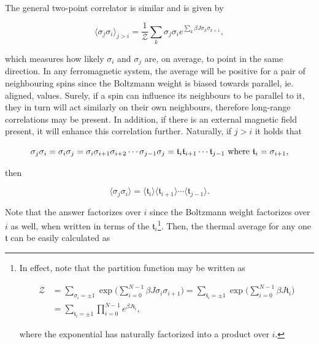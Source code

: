 \documentclass{homework}
\begin{document}
\blanky \\

The general two-point correlator is similar and is given by 

\begin{equation}
    \langle \sigma_j \sigma_i \rangle_{j > i} = \frac{1}{\mathcal{Z}} \sum_{k} \sigma_j \sigma_i e^{\sum_{k} \beta J \sigma_k \sigma_{k+1}},
\end{equation}

which measures how likely $\sigma_i$ and $\sigma_j$ are, on average, to point in the same direction. In any ferromagnetic system, the average will be positive for a pair of neighbouring spins since the Boltzmann weight is biased towards parallel, ie. aligned, values. Surely, if a spin can influence its neighbours to be parallel to it, they in turn will act similarly on their own neighbours, therefore long-range correlations may be present. In addition, if there is an external magnetic field present, it will enhance this correlation further. Naturally, if $j>i$ it holds that 

\begin{equation*}
    \sigma_j \sigma_i = \sigma_i \sigma_j = \sigma_i \sigma_{i+1} \sigma_{i+2} \cdots \sigma_{j-1} \sigma_j = \mathfrak{t}_{i}\mathfrak{t}_{i+1}\cdots\mathfrak{t}_{j-1} \textnormal{ where } \mathfrak{t}_i = \sigma_{i+1}, 
\end{equation*}

then 

\begin{equation}
    \langle \sigma_j \sigma_i \rangle = \langle \mathfrak{t}_i \rangle \langle \mathfrak{t}_{i+1} \rangle \cdots \langle \mathfrak{t}_{j-1} \rangle.
\end{equation}

Note that the answer factorizes over $i$ since the Boltzmann weight factorizes over $i$ as well, when written in terms of the $\mathfrak{t}_i$\footnote{In effect, note that the partition function may be written as 

\begin{equation}
\begin{split}
    \mathcal{Z} &= \sum_{\sigma_i = \pm 1} \exp \bigg(\sum_{i=0}^{N-1} \beta J \sigma_i \sigma_{i+1} \bigg) = \sum_{\mathfrak{t}_i = \pm 1} \exp \bigg(\sum_{i=0}^{N-1} \beta J \mathfrak{t}_i \bigg) \\
    &= \sum_{\mathfrak{t}_i = \pm 1} \prod_{i=0}^{N-1} e^{\beta J \mathfrak{t}_i},
\end{split}
\end{equation}

where the exponential has naturally factorized into a product over $i$.}. Then, the thermal average for any one $\mathfrak{t}$ can be easily calculated as 
\end{document}
